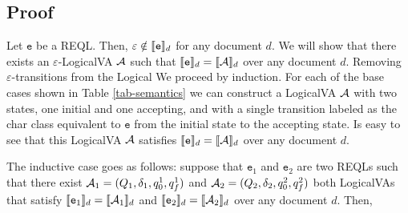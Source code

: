 \subsection{Proof}

Let $\texttt{e}$ be a REQL. Then, $\varepsilon \notin \llbracket\texttt{e}\rrbracket_{d}$ for any
document $d$. We will show that there exists an $\varepsilon$-LogicalVA $\mathcal{A}$
such that $\llbracket\texttt{e}\rrbracket_d = \llbracket\mathcal{A}\rrbracket_d$ over any document $d$. Removing
$\varepsilon$-transitions from the Logical  We proceed by induction. For each of
the base cases shown in Table \ref*{tab-semantics} we can construct a LogicalVA
$\mathcal{A}$ with two states, one initial and one accepting, and with a single
transition labeled as the char class equivalent to $\texttt{e}$ from the initial
state to the accepting state. Is easy to see that this LogicalVA $\mathcal{A}$ satisfies
$\llbracket\texttt{e}\rrbracket_d = \llbracket\mathcal{A}\rrbracket_d$ over any document $d$. 

The inductive case goes as follows: suppose that $\texttt{e}_1$ and
$\texttt{e}_2$ are two REQLs such that there exist $\mathcal{A}_1 = (Q_1, \delta_1,
q_0^1, q_f^1)$ and $\mathcal{A}_2 = (Q_2, \delta_2, q_0^2, q_f^2)$ both LogicalVAs that
satisfy $\llbracket\texttt{e}_1\rrbracket_d = \llbracket\mathcal{A}_1\rrbracket_d$ and $\llbracket\texttt{e}_2\rrbracket_d =
\llbracket\mathcal{A}_2\rrbracket_d$ over any document $d$. Then,


